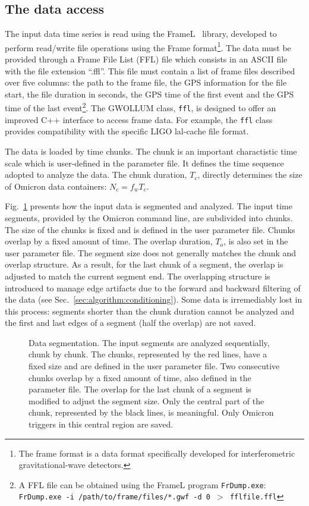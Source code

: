 \subsection{The data access} \label{sec:algorithm:data}
The input data time series is read using the FrameL~\cite{FrameL} library, developed to perform read/write file operations using the Frame format\footnote{The frame format is a data format specifically developed for interferometric gravitational-wave detectors.}. The data must be provided through a Frame File List (FFL) file which consists in an ASCII file with the file extension ``.ffl''. This file must contain a list of frame files described over five columns: the path to the frame file, the GPS information for the file start, the file duration in seconds, the GPS time of the first event and the GPS time of the last event\footnote{A FFL file can be obtained using the FrameL program \texttt{FrDump.exe}: \texttt{FrDump.exe -i /path/to/frame/files/*.gwf -d 0 $>$ fflfile.ffl}}. The GWOLLUM class, \texttt{ffl}, is designed to offer an improved C++ interface to access frame data. For example, the \texttt{ffl} class provides compatibility with the specific LIGO lal-cache file format.

The data is loaded by time chunks. The chunk is an important charactistic time scale which is user-defined in the parameter file. It defines the time sequence adopted to analyze the data. The chunk duration, $T_c$, directly determines the size of Omicron data containers: $N_c=f_wT_c$.

Fig.~\ref{fig:segmentation} presents how the input data is segmented and analyzed. The input time segments, provided by the Omicron command line, are subdivided into chunks. The size of the chunks is fixed and is defined in the user parameter file. Chunks overlap by a fixed amount of time. The overlap duration, $T_o$, is also set in the user parameter file. The segment size does not generally matches the chunk and overlap structure. As a result, for the last chunk of a segment, the overlap is adjusted to match the current segment end. The overlapping structure is introduced to manage edge artifacts due to the forward and backward filtering of the data (see Sec.~\ref{sec:algorithm:conditioning}). Some data is irremediably lost in this process: segments shorter than the chunk duration cannot be analyzed and the first and last edges of a segment (half the overlap) are not saved.
\begin{figure}
  \center
  \caption{Data segmentation. The input segments are analyzed sequentially, chunk by chunk. The chunks, represented by the red lines, have a fixed size and are defined in the user parameter file. Two consecutive chunks overlap by a fixed amount of time, also defined in the parameter file. The overlap for the last chunk of a segment is modified to adjust the segment size. Only the central part of the chunk, represented by the black lines, is meaningful. Only Omicron triggers in this central region are saved.}
  \label{fig:segmentation}
\end{figure}

